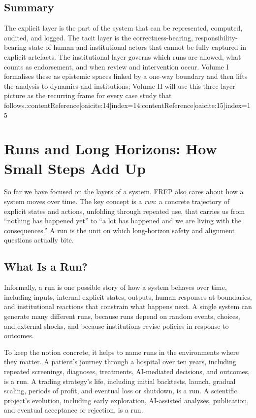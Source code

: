 \section{Summary}

The explicit layer is the part of the system that can be represented, computed, audited, and logged. The tacit layer is the correctness-bearing, responsibility-bearing state of human and institutional actors that cannot be fully captured in explicit artefacts. The institutional layer governs which runs are allowed, what counts as endorsement, and when review and intervention occur. Volume I formalises these as epistemic spaces linked by a one-way boundary and then lifts the analysis to dynamics and institutions; Volume II will use this three-layer picture as the recurring frame for every case study that follows.:contentReference[oaicite:14]{index=14}:contentReference[oaicite:15]{index=15}

\chapter{Runs and Long Horizons: How Small Steps Add Up}

So far we have focused on the layers of a system. FRFP also cares about how a system moves over time. The key concept is a \emph{run}: a concrete trajectory of explicit states and actions, unfolding through repeated use, that carries us from ``nothing has happened yet'' to ``a lot has happened and we are living with the consequences.'' A run is the unit on which long-horizon safety and alignment questions actually bite.

\section{What Is a Run?}

Informally, a run is one possible story of how a system behaves over time, including inputs, internal explicit states, outputs, human responses at boundaries, and institutional reactions that constrain what happens next. A single system can generate many different runs, because runs depend on random events, choices, and external shocks, and because institutions revise policies in response to outcomes.

To keep the notion concrete, it helps to name runs in the environments where they matter. A patient's journey through a hospital over ten years, including repeated screenings, diagnoses, treatments, AI-mediated decisions, and outcomes, is a run. A trading strategy's life, including initial backtests, launch, gradual scaling, periods of profit, and eventual loss or shutdown, is a run. A scientific project’s evolution, including early exploration, AI-assisted analyses, publication, and eventual acceptance or rejection, is a run.

